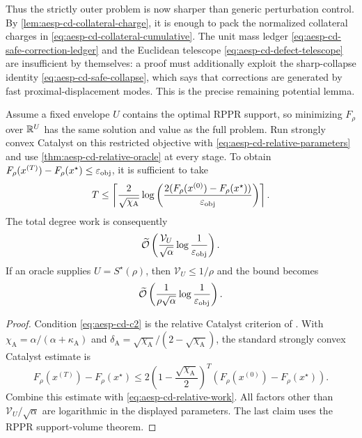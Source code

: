Thus the strictly outer problem is now sharper than generic perturbation
control.  By \cref{lem:aesp-cd-collateral-charge}, it is enough to pack the
normalized collateral charges in
\cref{eq:aesp-cd-collateral-cumulative}.  The unit mass ledger
\cref{eq:aesp-cd-safe-correction-ledger} and the Euclidean telescope
\cref{eq:aesp-cd-defect-telescope} are insufficient by themselves: a proof
must additionally exploit the sharp-collapse identity
\cref{eq:aesp-cd-safe-collapse}, which says that corrections are generated by
fast proximal-displacement modes.  This is the precise remaining potential
lemma.

\begin{corollary}
\label{cor:aesp-cd-certified-envelope}
Assume a fixed envelope $U$ contains the optimal RPPR support, so minimizing
$F_\rho$ over $\mathbb{R}^U$ has the same solution and value as the full problem.
Run strongly convex Catalyst on this restricted objective with
\cref{eq:aesp-cd-relative-parameters} and use
\cref{thm:aesp-cd-relative-oracle} at every stage.  To obtain
$F_\rho(x^{(T)})-F_\rho(x^\star)\leq\varepsilon_{\mathrm{obj}}$, it is sufficient to take
\begin{equation*}
 T\leq
 \left\lceil\frac{2}{\sqrt{\chi_{\mathrm A}}}
 \log\left(\frac{2(F_\rho(x^{(0)})-F_\rho(x^\star))}{\varepsilon_{\mathrm{obj}}}\right)
 \right\rceil.
\end{equation*}
The total degree work is consequently
\begin{equation}
 \widetilde{\mathcal{O}}\left(\frac{\mathcal V_U}{\sqrt\alpha}
                  \log\frac1{\varepsilon_{\mathrm{obj}}}\right).
 \label{eq:aesp-cd-certified-envelope-work}
\end{equation}
If an oracle supplies $U=S^\star(\rho)$, then
$\mathcal V_U\leq1/\rho$ and the bound becomes
\begin{equation}
 \widetilde{\mathcal{O}}\left(\frac1{\rho\sqrt\alpha}
                  \log\frac1{\varepsilon_{\mathrm{obj}}}\right).
 \label{eq:aesp-cd-support-oracle-work}
\end{equation}
\end{corollary}

\begin{proof}
Condition \cref{eq:aesp-cd-c2} is the relative Catalyst criterion of
\citet{lin2018catalyst}.  With
$\chi_{\mathrm A}=\alpha/(\alpha+\kappa_{\mathrm A})$ and
$\delta_{\mathrm A}=\sqrt{\chi_{\mathrm A}}/(2-\sqrt{\chi_{\mathrm A}})$,
the standard strongly convex Catalyst estimate is
\begin{equation*}
 F_\rho(x^{(T)})-F_\rho(x^\star)
 \leq2\left(1-\frac{\sqrt{\chi_{\mathrm A}}}{2}\right)^T
       (F_\rho(x^{(0)})-F_\rho(x^\star)).
\end{equation*}
Combine this estimate with \cref{eq:aesp-cd-relative-work}.  All factors
other than $\mathcal V_U/\sqrt\alpha$ are logarithmic in the displayed
parameters.  The last claim uses the RPPR support-volume theorem.
\end{proof}

